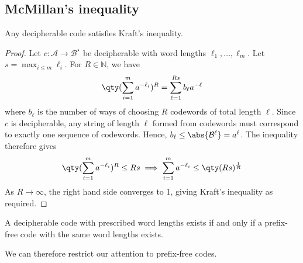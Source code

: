 \subsection{McMillan's inequality}
\begin{theorem}
    Any decipherable code satisfies Kraft's inequality.
\end{theorem}
\begin{proof}
    Let $c \colon \mathcal A \to \mathcal B^\star$ be decipherable with word lengths $\ell_1, \dots, \ell_m$.
    Let $s = \max_{i \leq m} \ell_i$.
    For $R \in \mathbb N$, we have
    \[ \qty(\sum_{i=1}^m a^{-\ell_i})^R = \sum_{\ell = 1}^{Rs} b_\ell a^{-\ell} \]
    where $b_\ell$ is the number of ways of choosing $R$ codewords of total length $\ell$.
    Since $c$ is decipherable, any string of length $\ell$ formed from codewords must correspond to exactly one sequence of codewords.
    Hence, $b_\ell \leq \abs{\mathcal B^\ell} = a^\ell$.
    The inequality therefore gives
    \[ \qty(\sum_{i=1}^m a^{-\ell_i})^R \leq Rs \implies \sum_{i=1}^m a^{-\ell_i} \leq \qty(Rs)^{\frac{1}{R}} \]
    As $R \to \infty$, the right hand side converges to 1, giving Kraft's inequality as required.
\end{proof}
\begin{corollary}
    A decipherable code with prescribed word lengths exists if and only if a prefix-free code with the same word lengths exists.
\end{corollary}
We can therefore restrict our attention to prefix-free codes.

